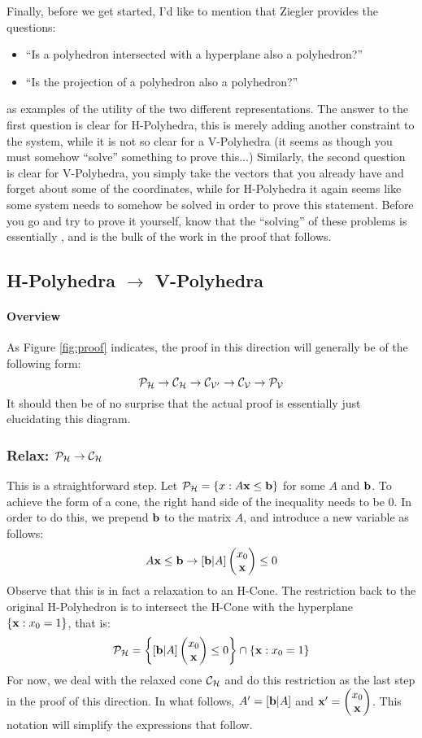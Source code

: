 \medskip
Finally, before we get started, I'd like to mention that Ziegler provides the questions:
\begin{itemize}
  \item ``Is a polyhedron intersected with a hyperplane also a polyhedron?''
  \item ``Is the projection of a polyhedron also a polyhedron?''
\end{itemize}
as examples of the utility of the two different representations.  The answer to the first question is clear for H-Polyhedra, this is merely adding another constraint to the system, while it is not so clear for a V-Polyhedra (it seems as though you must somehow ``solve'' something to prove this...)  Similarly, the second question is clear for V-Polyhedra, you simply take the vectors that you already have and forget about some of the coordinates, while for H-Polyhedra it again seems like some system needs to somehow be solved in order to prove this statement.  Before you go and try to prove it yourself, know that the ``solving'' of these problems is essentially \FME, and is the bulk of the work in the proof that follows.

\subsection{H-Polyhedra $\to$ V-Polyhedra}
\paragraph{Overview}
As Figure \ref{fig:proof} indicates, the proof in this direction will generally be of the following form:
  \[ \mathcal{P}_{\mathcal{H}} \to \mathcal{C}_{\mathcal{H}} \to \mathcal{C}_{\mathcal{V'}} \to \mathcal{C}_{\mathcal{V}} \to \mathcal{P}_{\mathcal{V}} \]
It should then be of no surprise that the actual proof is essentially just elucidating this diagram.

\subsubsection{Relax: $\mathcal{P}_{\mathcal{H}} \to \mathcal{C}_{\mathcal{H}}$} 
This is a straightforward step.  Let $\mathcal{P}_{\mathcal{H}} = \{x : A\mathbf{x} \leq \mathbf{b}\}$ for some $A$ and $\mathbf{b}$.  To achieve the form of a cone, the right hand side of the inequality needs to be $0$.  In order to do this, we prepend $\mathbf{b}$ to the matrix $A$, and introduce a new variable as follows:
  \[ A\mathbf{x} \leq \mathbf{b} \to [\mathbf{b}|A] \begin{pmatrix}x_0 \\ \mathbf{x}\end{pmatrix} \leq 0 \]
Observe that this is in fact a relaxation to an H-Cone.  The restriction back to the original H-Polyhedron is to intersect the H-Cone with the hyperplane $\{\mathbf{x} : x_0 = 1\}$, that is:
  \[ \mathcal{P}_{\mathcal{H}} = \left\{ [\mathbf{b}|A] \begin{pmatrix}x_0 \\ \mathbf{x}\end{pmatrix} \leq 0 \right\} \cap \{ \mathbf{x} : x_0 = 1 \} \]
For now, we deal with the relaxed cone $\mathcal{C}_{\mathcal{H}}$ and do this restriction as the last step in the proof of this direction.  In what follows, $A' = [\mathbf{b}|A]$ and $\mathbf{x}' = \begin{pmatrix}x_0 \\ \mathbf{x}\end{pmatrix}$.  This notation will simplify the expressions that follow.

